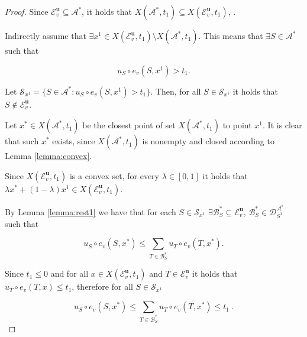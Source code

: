 \documentclass[a4paper,12pt]{article}
\theoremstyle{definition}
\theoremstyle{remark}
\begin{document}
\begin{proof}
Since $\mathcal{E}_v^{\mathbf{u}} \subseteq \mathcal{A}^\ast$, it holds that $X(\mathcal{A}^\ast, t_1) \subseteq X(\mathcal{E}_v^{\mathbf{u}}, t_1)$, .

Indirectly assume that $\exists x^{1}\in X(\mathcal{E}_v^{\mathbf{u}}, t_1) \setminus X(\mathcal{A}^\ast, t_1)$. This means that $\exists S \in \mathcal{A}^*$ such that

\begin{equation}\label{eq:e>t}
u_S \circ e_v(S, x^1) > t_1.
\end{equation}

Let $\mathcal{S}_{x^1} = \{ S\in \mathcal{A}^* \colon u_S\circ e_v(S, x^1) > t_1\}$. Then, for all $S\in \mathcal{S}_{x^1}$ it holds that $S\notin \mathcal{E}_v^{\mathbf{u}}$.

Let $x^\ast \in X(\mathcal{A}^\ast, t_1)$ be the closest point of set $X(\mathcal{A}^\ast, t_1)$ to point $x^1$. It is clear that such $x^\ast$ exists, since $X(\mathcal{A}^\ast, t_1)$ is nonempty and closed according to Lemma \ref{lemma:convex}. 


Since $X(\mathcal{E}_v^{\mathbf{u}}, t_1)$ is a convex set, for every $\lambda \in [0,1]$ it holds that $\lambda x^\ast + (1-\lambda) x^1 \in X(\mathcal{E}_v^{\mathbf{u}}, t_1)$.

By Lemma \ref{lemma:rest1} we have that for each $S\in \mathcal{S}_{x^1}$ $\exists \mathcal{B}^\ast_S\subseteq \mathcal{E}_v^{\mathbf{u}}$, $\mathcal{B}^\ast_S\in \mathcal{D}_{S^1}^{\mathcal{A}^\ast}$ such that 

\begin{equation}\label{eq:choice_of_B*}
u_{S}\circ e_v(S, x^\ast) \leq \sum_{T\in \mathcal{B}^*_S}u_T\circ e_v(T, x^\ast).
\end{equation}

Since $t_1 \leq 0$ and for all $x\in X(\mathcal{E}_v^{\mathbf{u}}, t_1)$ and $T\in \mathcal{E}_v^{\mathbf{u}}$ it holds that $u_T\circ e_v(T, x) \leq t_1$, therefore for all $S\in \mathcal{S}_{x^1}$

\begin{equation}\label{eq:e<=t}
u_{S}\circ e_v(S, x^\ast) \leq \sum_{T\in \mathcal{B}^\ast_S}u_T\circ e_v(T, x^\ast) \leq t_1 \ .
\end{equation}


\end{proof}
\end{document}
